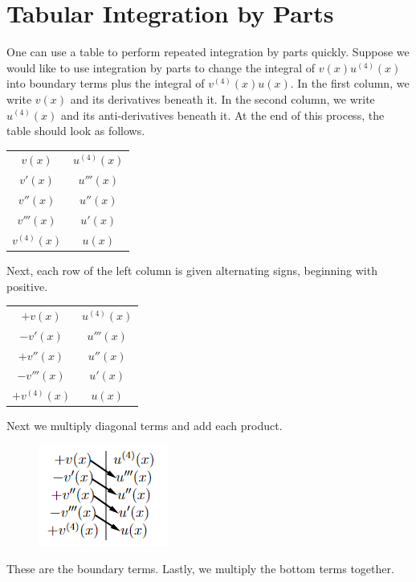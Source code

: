 \newpage
\section{Tabular Integration by Parts}
    One can use a table to perform repeated integration by parts quickly. Suppose we would like to use integration by parts to change the integral of \(v(x)u^{(4)}(x)\) into boundary terms plus the integral of \(v^{(4)}(x)u(x)\). In the first column, we write \(v(x)\) and its derivatives beneath it. In the second column, we write \(u^(4)(x)\) and its anti-derivatives beneath it. At the end of this process, the table should look as follows.
    \begin{table}[H]
        \centering
        \begin{tabular}{c|c}
            \(v(x)\) & \(u^{(4)}(x)\)\\
            \(v'(x)\) & \(u'''(x)\)\\
            \(v''(x)\) & \(u''(x)\)\\
            \(v'''(x)\) & \(u'(x)\)\\
            \(v^{(4)}(x)\) &\(u(x)\)
        \end{tabular}
    \end{table}
    Next, each row of the left column is given alternating signs, beginning with positive.
    \begin{table}[H]
        \centering
        \begin{tabular}{c|c}
            \(+v(x)\) & \(u^{(4)}(x)\)\\
            \(-v'(x)\) & \(u'''(x)\)\\
            \(+v''(x)\) & \(u''(x)\)\\
            \(-v'''(x)\) & \(u'(x)\)\\
            \(+v^{(4)}(x)\) &\(u(x)\)
        \end{tabular}
    \end{table}
    Next we multiply diagonal terms and add each product.
    \begin{figure}[H]
        \centering
        \includegraphics{include/tabular-boundary.png}
    \end{figure}
    These are the boundary terms. Lastly, we multiply the bottom terms together. 
